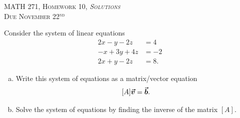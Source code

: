 \documentclass[12pt]{article} %
\begin{document}
\begin{center}
   \textsc{\large MATH 271, Homework 10, \emph{Solutions}}\\
   \textsc{Due November 22$^\textrm{nd}$}
\end{center}
\vspace{.5cm}

\begin{problem}
Consider the system of linear equations
\begin{align*}
    2x-y-2z&=4\\
    -x + 3y +4z &= -2\\
    2x+y-2z&=8.
\end{align*}
\begin{enumerate}[(a)]
    \item Write this system of equations as a matrix/vector equation
    \[
    [A]\boldsymbol{\vec{v}}=\boldsymbol{\vec{b}}.
    \]
    \item Solve the system of equations by finding the inverse of the matrix $[A]$.
\end{enumerate}
\end{problem}
\end{document}
